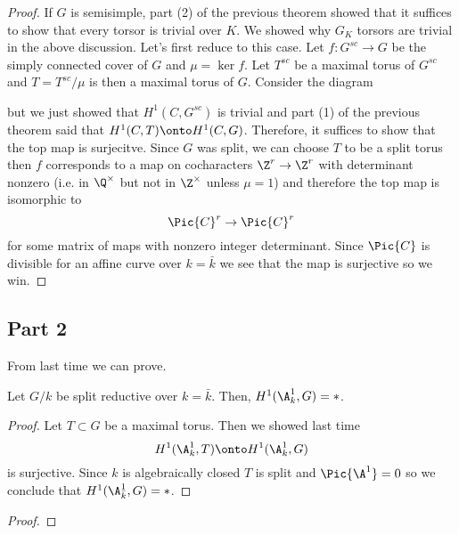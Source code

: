 \documentclass{article}
\begin{document}
\begin{proof}
If $G$ is semisimple, part (2) of the previous theorem showed that it suffices to show that every torsor is trivial over $K$. We showed why $G_K$ torsors are trivial in the above discussion. Let's first reduce to this case.
Let $f : G^{sc} \to G$ be the simply connected cover of $G$ and $\mu = \ker{f}$. Let $T^{sc}$ be a maximal torus of $G^{sc}$ and $T = T^{sc} / \mu$ is then a maximal torus of $G$. Consider the diagram
\begin{center}
\end{center}
but we just showed that $H^1(C, G^{sc})$ is trivial and part (1) of the previous theorem said that $H^1(C, T) \onto H^1(C, G)$. Therefore, it suffices to show that the top map is surjecitve. Since $G$ was split, we can choose $T$ to be a split torus then $f$ corresponds to a map on cocharacters $\Z^r \to \Z^r$ with determinant nonzero (i.e. in $\Q^\times$ but not in $\Z^\times$ unless $\mu = 1$) and therefore the top map is isomorphic to
\[ \Pic{C}^r \to \Pic{C}^r \]
for some matrix of maps with nonzero integer determinant. Since $\Pic{C}$ is divisible for an affine curve over $k = \bar{k}$ we see that the map is surjective so we win. 
\end{proof}

\subsection{Part 2}

From last time we can prove.

\begin{theorem}
Let $G / k$ be split reductive over $k = \bar{k}$. Then,
$H^1(\A^1_{k}, G) = *$. 
\end{theorem} 

\begin{proof}
Let $T \subset G$ be a maximal torus. Then we showed last time
\[ H^1(\A^1_k, T) \onto H^1(\A^1_k, G) \]
is surjective. Since $k$ is algebraically closed $T$ is split and $\Pic{\A^1} = 0$ so we conclude that $H^1(\A^1_{\bar{k}}, G) = *$.
\end{proof}


\begin{proof}

\end{proof}
\end{document}
